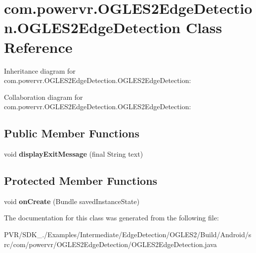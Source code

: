 \hypertarget{classcom_1_1powervr_1_1_o_g_l_e_s2_edge_detection_1_1_o_g_l_e_s2_edge_detection}{\section{com.\+powervr.\+O\+G\+L\+E\+S2\+Edge\+Detection.\+O\+G\+L\+E\+S2\+Edge\+Detection Class Reference}
\label{classcom_1_1powervr_1_1_o_g_l_e_s2_edge_detection_1_1_o_g_l_e_s2_edge_detection}
}


Inheritance diagram for com.\+powervr.\+O\+G\+L\+E\+S2\+Edge\+Detection.\+O\+G\+L\+E\+S2\+Edge\+Detection\+:


Collaboration diagram for com.\+powervr.\+O\+G\+L\+E\+S2\+Edge\+Detection.\+O\+G\+L\+E\+S2\+Edge\+Detection\+:
\subsection*{Public Member Functions}
\begin{DoxyCompactItemize}
\item 
\hypertarget{classcom_1_1powervr_1_1_o_g_l_e_s2_edge_detection_1_1_o_g_l_e_s2_edge_detection_ae6d4f1fb5d8cc2813788fd65d61bc5ba}{void {\bfseries display\+Exit\+Message} (final String text)}\label{classcom_1_1powervr_1_1_o_g_l_e_s2_edge_detection_1_1_o_g_l_e_s2_edge_detection_ae6d4f1fb5d8cc2813788fd65d61bc5ba}

\end{DoxyCompactItemize}
\subsection*{Protected Member Functions}
\begin{DoxyCompactItemize}
\item 
\hypertarget{classcom_1_1powervr_1_1_o_g_l_e_s2_edge_detection_1_1_o_g_l_e_s2_edge_detection_ae04750757a8836bb3319f8e780f8280e}{void {\bfseries on\+Create} (Bundle saved\+Instance\+State)}\label{classcom_1_1powervr_1_1_o_g_l_e_s2_edge_detection_1_1_o_g_l_e_s2_edge_detection_ae04750757a8836bb3319f8e780f8280e}

\end{DoxyCompactItemize}


The documentation for this class was generated from the following file\+:\begin{DoxyCompactItemize}
\item 
P\+V\+R/\+S\+D\+K\+\_./\+Examples/\+Intermediate/\+Edge\+Detection/\+O\+G\+L\+E\+S2/\+Build/\+Android/src/com/powervr/\+O\+G\+L\+E\+S2\+Edge\+Detection/O\+G\+L\+E\+S2\+Edge\+Detection.\+java\end{DoxyCompactItemize}
